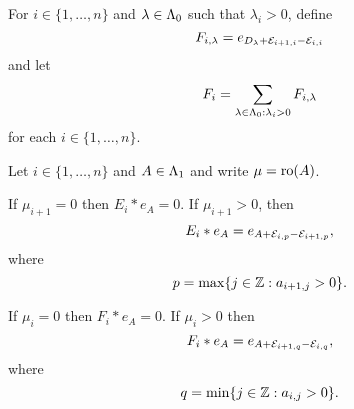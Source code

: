 \documentclass[a4paper, 11pt]{report}
\begin{document}
For $i\in\{1,\ldots,n\}$ and $\lambda\in\Lambda_0{}$ such that $\lambda_i>0$, define
\begin{equation*}
F_{i,\lambda} = e_{D_{\lambda} + \mathcal{E}_{i+1,i} - \mathcal{E}_{i,i}}
\end{equation*}
and let
\begin{equation*}
F_i = \sum_{\lambda\in\Lambda_0{}:\lambda_i>0} F_{i,\lambda}
\end{equation*}
for each $i\in\{1,\ldots,n\}$.

\begin{lemma}\label{lemma:fundamental-multiplication-rule-generic}
Let $i\in\{1,\ldots,n\}$ and $A\in\Lambda_1{}$ and write $\mu=\operatorname{ro}(A)$.

If $\mu_{i+1}=0$ then $E_i\ast e_A=0$. If $\mu_{i+1}>0$, then
\begin{equation*}
E_i\ast e_A = e_{A+\mathcal{E}_{i,p}-\mathcal{E}_{i+1,p}},
\end{equation*}
where
\begin{equation*}
p=\max\{j\in\mathbb{Z}:a_{i+1,j}>0\}.
\end{equation*}

If $\mu_i=0$ then $F_i\ast e_A=0$. If $\mu_i>0$ then
\begin{equation*}
F_i\ast e_A = e_{A+\mathcal{E}_{i+1,q}-\mathcal{E}_{i,q}},
\end{equation*}
where
\begin{equation*}
q=\min\{j\in\mathbb{Z}: a_{i,j}>0\}.
\end{equation*}
\end{lemma}
\end{document}

